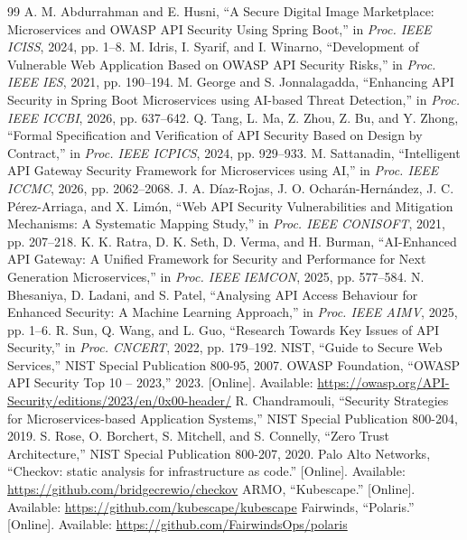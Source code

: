 \documentclass[conference]{IEEEtran}
\begin{document}
\begin{thebibliography}{99}
 A. M. Abdurrahman and E. Husni, ``A Secure Digital Image Marketplace: Microservices and OWASP API Security Using Spring Boot,'' in \textit{Proc. IEEE ICISS}, 2024, pp. 1--8.
 M. Idris, I. Syarif, and I. Winarno, ``Development of Vulnerable Web Application Based on OWASP API Security Risks,'' in \textit{Proc. IEEE IES}, 2021, pp. 190--194.
 M. George and S. Jonnalagadda, ``Enhancing API Security in Spring Boot Microservices using AI-based Threat Detection,'' in \textit{Proc. IEEE ICCBI}, 2026, pp. 637--642.
 Q. Tang, L. Ma, Z. Zhou, Z. Bu, and Y. Zhong, ``Formal Specification and Verification of API Security Based on Design by Contract,'' in \textit{Proc. IEEE ICPICS}, 2024, pp. 929--933.
 M. Sattanadin, ``Intelligent API Gateway Security Framework for Microservices using AI,'' in \textit{Proc. IEEE ICCMC}, 2026, pp. 2062--2068.
 J. A. D\'iaz-Rojas, J. O. Ochar\'an-Hern\'andez, J. C. P\'erez-Arriaga, and X. Lim\'on, ``Web API Security Vulnerabilities and Mitigation Mechanisms: A Systematic Mapping Study,'' in \textit{Proc. IEEE CONISOFT}, 2021, pp. 207--218.
 K. K. Ratra, D. K. Seth, D. Verma, and H. Burman, ``AI-Enhanced API Gateway: A Unified Framework for Security and Performance for Next Generation Microservices,'' in \textit{Proc. IEEE IEMCON}, 2025, pp. 577--584.
 N. Bhesaniya, D. Ladani, and S. Patel, ``Analysing API Access Behaviour for Enhanced Security: A Machine Learning Approach,'' in \textit{Proc. IEEE AIMV}, 2025, pp. 1--6.
 R. Sun, Q. Wang, and L. Guo, ``Research Towards Key Issues of API Security,'' in \textit{Proc. CNCERT}, 2022, pp. 179--192.
 NIST, ``Guide to Secure Web Services,'' NIST Special Publication 800-95, 2007.
 OWASP Foundation, ``OWASP API Security Top 10 -- 2023,'' 2023. [Online]. Available: \url{https://owasp.org/API-Security/editions/2023/en/0x00-header/}
 R. Chandramouli, ``Security Strategies for Microservices-based Application Systems,'' NIST Special Publication 800-204, 2019.
 S. Rose, O. Borchert, S. Mitchell, and S. Connelly, ``Zero Trust Architecture,'' NIST Special Publication 800-207, 2020.
 Palo Alto Networks, ``Checkov: static analysis for infrastructure as code.'' [Online]. Available: \url{https://github.com/bridgecrewio/checkov}
 ARMO, ``Kubescape.'' [Online]. Available: \url{https://github.com/kubescape/kubescape}
 Fairwinds, ``Polaris.'' [Online]. Available: \url{https://github.com/FairwindsOps/polaris}

\end{thebibliography}
\end{document}
